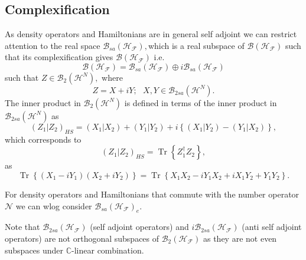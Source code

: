 \documentclass[aps,preprint]{revtex4}%
\begin{document}
\subsection{Complexification}

As density operators and Hamiltonians are in general self adjoint we can
restrict attention to the real space $\mathcal{B}_{sa}\left(  \mathcal{H}%
_{\mathcal{F}}\right)  ,$which is a real subspace of $\mathcal{B}\left(
\mathcal{H}_{\mathcal{F}}\right)  $ such that its complexification gives
$\mathcal{B}\left(  \mathcal{H}_{\mathcal{F}}\right)  $ i.e.
\begin{equation}
\mathcal{B}\left(  \mathcal{H}_{\mathcal{F}}\right)  =\mathcal{B}_{sa}\left(
\mathcal{H}_{\mathcal{F}}\right)  \oplus i\mathcal{B}_{sa}\left(
\mathcal{H}_{\mathcal{F}}\right)
\end{equation}
such that $Z\in\mathcal{B}_{2}\left(  \mathcal{H}^{N}\right)  ,$ where
\begin{equation}
Z=X+iY;\text{ }X,Y\in\mathcal{B}_{2sa}\left(  \mathcal{H}^{N}\right)  .
\end{equation}
The inner product in $\mathcal{B}_{2}\left(  \mathcal{H}^{N}\right)  $ is
defined in terms of the inner product in $\mathcal{B}_{2sa}\left(
\mathcal{H}^{N}\right)  $ as
\begin{equation}
\left(  Z_{1}\left\vert Z_{2}\right.  \right)  _{HS}=\left(  X_{1}\left\vert
X_{2}\right.  \right)  +\left(  Y_{1}\left\vert Y_{2}\right.  \right)
+i\left\{  \left(  X_{1}\left\vert Y_{2}\right.  \right)  -\left(
Y_{1}\left\vert X_{2}\right.  \right)  \right\}  ,
\end{equation}
which corresponds to
\begin{equation}
\left(  Z_{1}\left\vert Z_{2}\right.  \right)  _{HS}=\operatorname{Tr}\left\{
Z_{1}^{\dagger}Z_{2}\right\}  ,
\end{equation}
as%
\begin{equation}
\operatorname{Tr}\left\{  \left(  X_{1}-iY_{1}\right)  \left(  X_{2}%
+iY_{2}\right)  \right\}  =\operatorname{Tr}\left\{  X_{1}X_{2}-iY_{1}%
X_{2}+iX_{1}Y_{2}+Y_{1}Y_{2}\right\}  .
\end{equation}


For density operators and Hamiltonians that commute with the number operator
$\mathcal{N}$ we can wlog consider $\mathcal{B}_{sa}\left(  \mathcal{H}%
_{\mathcal{F}}\right)  _{e}.$

Note that $\mathcal{B}_{2sa}\left(  \mathcal{H}_{\mathcal{F}}\right)  $ (self
adjoint operators) and $i\mathcal{B}_{2sa}\left(  \mathcal{H}_{\mathcal{F}%
}\right)  $ (anti self adjoint operators) are not orthogonal subspaces of
$\mathcal{B}_{2}\left(  \mathcal{H}_{\mathcal{F}}\right)  $ as they are not
even subspaces under $\mathbb{C}$-linear combination.
\end{document}
